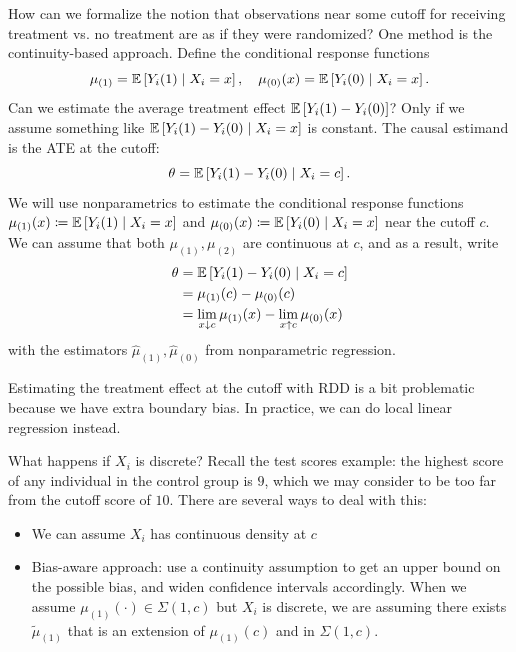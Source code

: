 How can we formalize the notion that observations near some cutoff for receiving treatment vs. no treatment are as if they were randomized?
One method is the continuity-based approach. Define the conditional response functions \[
	\mu_{(1)} = \mathbb{E}\left[Y_i(1) \mid X_i = x\right], \quad \mu_{(0)}(x) = \mathbb{E}\left[Y_i(0) \mid X_i = x\right]
.\] 
Can we estimate the average treatment effect $\mathbb{E}\left[Y_i(1) - Y_i(0)\right] $? Only if we assume something like $\mathbb{E}\left[Y_i(1) - Y_i(0) \mid X_i = x\right] $ is constant. 
The causal estimand is the ATE at the cutoff: \[
	\theta = \mathbb{E}\left[Y_i(1) - Y_i(0) \mid X_i = c\right] 
.\] 
We will use nonparametrics to estimate the conditional response functions $\mu_{(1)}(x) \coloneqq \mathbb{E}\left[Y_i(1) \mid X_i = x\right] $ and $\mu_{\left(0 \right)}(x) \coloneqq \mathbb{E}\left[Y_i(0) \mid X_i = x\right] $ near the cutoff $c$. We can assume that both $\mu_{(1)}, \mu_{(2)}$ are continuous at $c$, and as a result, write 
\begin{align*}
	\theta 
	&= \mathbb{E}\left[Y_i(1) - Y_i(0) \mid X_{i} = c\right] \\
	&= \mu_{(1)}(c) - \mu_{(0)}(c) \\
	&= \lim\limits_{x \downarrow c} \mu_{(1)}(x) - \lim\limits_{x \uparrow c} \mu_{(0)}(x)
\end{align*}
with the estimators $\hat{\mu}_{(1)}, \hat{\mu}_{(0)}$ from nonparametric regression.

Estimating the treatment effect at the cutoff with RDD is a bit problematic because we have extra boundary bias.
In practice, we can do local linear regression instead. 

What happens if $X_i$ is discrete? Recall the test scores example: the highest score of any individual in the control group is $9$, which we may consider to be too far from the cutoff score of $10$. There are several ways to deal with this:
\begin{itemize}
	\item We can assume $X_i$ has continuous density at $c$ 
	\item Bias-aware approach: use a continuity assumption to get an upper bound on the possible bias, and widen confidence intervals accordingly. When we assume $\mu_{(1)}(\cdot ) \in \Sigma(1,c)$ but $X_i$ is discrete, we are assuming there exists $\tilde{\mu}_{(1)}$ that is an extension of $\mu_{(1)}(c)$ and in $\Sigma(1,c)$.
\end{itemize}

